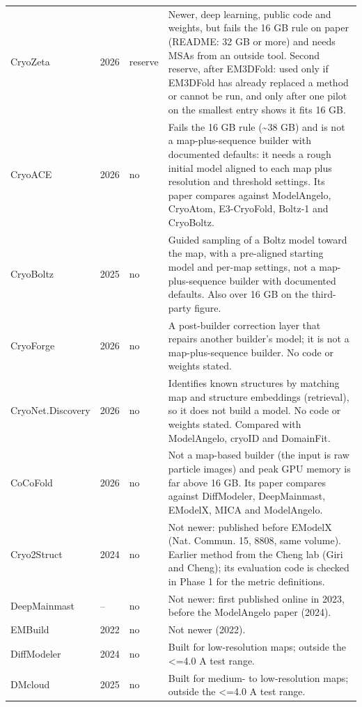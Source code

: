 \begin{longtable}{@{}p{3.0cm}p{0.9cm}p{1.5cm}p{9.0cm}@{}}
CryoZeta & 2026 & reserve & {\footnotesize Newer, deep learning, public code and weights, but fails the 16 GB rule on paper (README: 32 GB or more) and needs MSAs from an outside tool. Second reserve, after EM3DFold: used only if EM3DFold has already replaced a method or cannot be run, and only after one pilot on the smallest entry shows it fits 16 GB.} \\
CryoACE & 2026 & no & {\footnotesize Fails the 16 GB rule (\textasciitilde{}38 GB) and is not a map-plus-sequence builder with documented defaults: it needs a rough initial model aligned to each map plus resolution and threshold settings. Its paper compares against ModelAngelo, CryoAtom, E3-CryoFold, Boltz-1 and CryoBoltz.} \\
CryoBoltz & 2025 & no & {\footnotesize Guided sampling of a Boltz model toward the map, with a pre-aligned starting model and per-map settings, not a map-plus-sequence builder with documented defaults. Also over 16 GB on the third-party figure.} \\
CryoForge & 2026 & no & {\footnotesize A post-builder correction layer that repairs another builder's model; it is not a map-plus-sequence builder. No code or weights stated.} \\
CryoNet.Discovery & 2026 & no & {\footnotesize Identifies known structures by matching map and structure embeddings (retrieval), so it does not build a model. No code or weights stated. Compared with ModelAngelo, cryoID and DomainFit.} \\
CoCoFold & 2026 & no & {\footnotesize Not a map-based builder (the input is raw particle images) and peak GPU memory is far above 16 GB. Its paper compares against DiffModeler, DeepMainmast, EModelX, MICA and ModelAngelo.} \\
Cryo2Struct & 2024 & no & {\footnotesize Not newer: published before EModelX (Nat. Commun. 15, 8808, same volume). Earlier method from the Cheng lab (Giri and Cheng); its evaluation code is checked in Phase 1 for the metric definitions.} \\
DeepMainmast & -- & no & {\footnotesize Not newer: first published online in 2023, before the ModelAngelo paper (2024).} \\
EMBuild & 2022 & no & {\footnotesize Not newer (2022).} \\
DiffModeler & 2024 & no & {\footnotesize Built for low-resolution maps; outside the <=4.0 A test range.} \\
DMcloud & 2025 & no & {\footnotesize Built for medium- to low-resolution maps; outside the <=4.0 A test range.} \\

\end{longtable}
